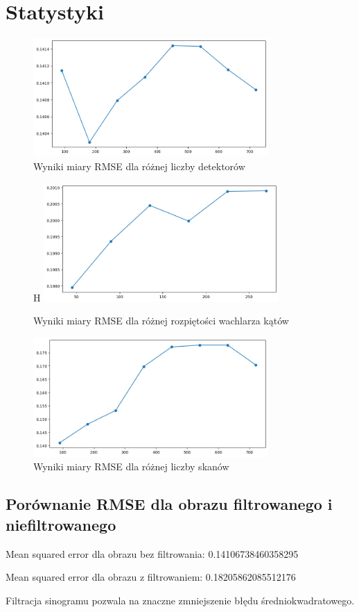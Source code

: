 \documentclass[11pt,a4paper]{article}
\begin{document}
    \section{Statystyki}
    \begin{figure}[H]
        \centering
        \includegraphics[width=0.8\textwidth]{rmse_detectors}
        \caption{Wyniki miary RMSE dla różnej liczby detektorów}
    \end{figure}

    \begin{figure}{H}
        \centering
        \includegraphics[width=0.8\textwidth]{mse_fan}
        \caption{Wyniki miary RMSE dla różnej rozpiętości wachlarza kątów}
    \end{figure}

    \begin{figure}[H]
        \centering
        \includegraphics[width=0.8\textwidth]{inputoutput3}
        \caption{Wyniki miary RMSE dla różnej liczby skanów}
    \end{figure}

    \subsection{Porównanie RMSE dla obrazu filtrowanego i niefiltrowanego}
    Mean squared error dla obrazu bez filtrowania: 0.14106738460358295

    Mean squared error dla obrazu z filtrowaniem: 0.18205862085512176

    Filtracja sinogramu pozwala na znaczne zmniejszenie błędu średniokwadratowego.
\end{document}
